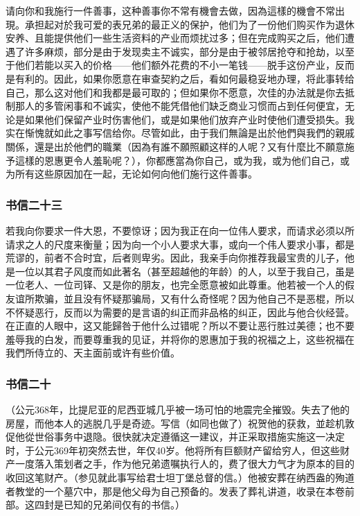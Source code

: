 请向你和我施行一件善事，这种善事你不常有機會去做，因為這樣的機會不常出現。承担起对於我可爱的表兄弟的最正义的保护，他们为了一份他们购买作为退休安养、且能提供他们一些生活资料的产业而烦扰过多；但在完成购买之后，他们遭遇了许多麻烦，部分是由于发现卖主不诚实，部分是由于被邻居抢夺和抢劫，以至于他们若能以买入的价格——他们额外花费的不小一笔钱——脱手这份产业，反而是有利的。因此，如果你愿意在审查契約之后，看如何最稳妥地办理，将此事转给自己，那么这对他们和我都是最可取的；但如果你不愿意，次佳的办法就是你去抵制那人的多管闲事和不诚实，使他不能凭借他们缺乏商业习惯而占到任何便宜，无论是如果他们保留产业时伤害他们，或是如果他们放弃产业时使他们遭受损失。我实在惭愧就如此之事写信给你。尽管如此，由于我们無論是出於他們與我們的親戚關係，還是出於他們的職業（因為有誰不願照顧这样的人呢？又有什麼比不願意施予這樣的恩惠更令人羞恥呢？），你都應當為你自己，或为我，或为他们自己，或为所有这些原因加在一起，无论如何向他们施行这件善事。\par


\subsubsection{书信二十三}

若我向你要求一件大恩，不要惊讶；因为我正在向一位伟人要求，而请求必须以所请求之人的尺度来衡量；因为向一个小人要求大事，或向一个伟人要求小事，都是荒谬的，前者不合时宜，后者则卑劣。因此，我亲手向你推荐我最宝贵的儿子，他是一位以其君子风度而如此著名（甚至超越他的年龄）的人，以至于我自己，虽是一位老人、一位司铎、又是你的朋友，也完全愿意被如此尊重。他若被一个人的假友谊所欺骗，並且没有怀疑那骗局，又有什么奇怪呢？因为他自己不是恶棍，所以不怀疑恶行，反而以为需要的是言语的纠正而非品格的纠正，因此与他合伙经营。在正直的人眼中，这又能歸咎于他什么过错呢？所以不要让恶行胜过美德；也不要羞辱我的白发，而要尊重我的见证，并将你的恩惠加于我的祝福之上，这些祝福在我們所侍立的、天主面前或许有些价值。\par


\subsubsection{书信二十}

（公元368年，比提尼亚的尼西亚城几乎被一场可怕的地震完全摧毁。失去了他的房屋，而他本人的逃脱几乎是奇迹。写信（如同也做了）祝贺他的获救，並趁机敦促他從世俗事务中退隐。很快就决定遵循这一建议，并正采取措施实施这一决定时，于公元369年初突然去世，年仅40岁。他将所有巨额财产留给穷人，但这些财产一度落入策划者之手，作为他兄弟遗嘱执行人的，费了很大力气才为原本的目的收回这笔财产。（参见就此事写给君士坦丁堡总督的信。）他被安葬在纳西盎的殉道者教堂的一个墓穴中，那是他父母为自己预备的。发表了葬礼讲道，收录在本卷前部。这四封是已知的兄弟间仅有的书信。）\par

